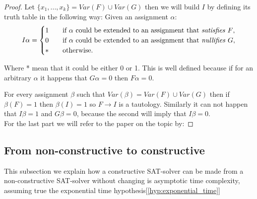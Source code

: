   \begin{proof} Let $\{x_1,...,x_k\} = Var(F)\cup Var(G)$ then we will build $I$ by defining its truth table in the following way: Given an assignment $\alpha$:
    \[   
      I\alpha = 
      \begin{cases}
        1&\quad\text{if $\alpha$ could be extended to an assignment that \emph{satisfies} $F$}, \\
        0&\quad\text{if $\alpha$ could be extended to an assignment that \emph{nullifies} $G$},\\
        * &\quad\text{otherwise.} \\ 
      \end{cases}
    \]

    Where * mean that it could be either 0 or 1.  This is well defined because if for an arbitrary $\alpha$ it happens that $G\alpha = 0$ then $F\alpha = 0$.

    For every assignment $\beta$ such that $Var(\beta) = Var(F)\cup Var(G)$ then if $\beta(F) = 1$ then $\beta(I) = 1$ so $F \to I$  is a tautology. Similarly it can not happen that $I\beta = 1 $ and $G\beta = 0$, because the second will imply that   $I\beta = 0$.\\

    For the last part we will refer to the paper on the topic by: 
  \end{proof}

  \subsection{From non-constructive to constructive}
  \label{sub:fromnon}
  This subsection we explain how a constructive SAT-solver can be made from a non-constructive SAT-solver without changing is asymptotic time complexity, assuming true the exponential time hypothesis[\ref{hyp:exponential_time}]

